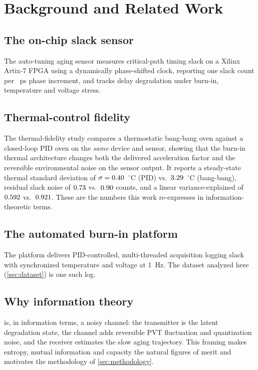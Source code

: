 \section{Background and Related Work}
\label{sec:background}


\subsection{The on-chip slack sensor}
The auto-tuning aging sensor \cite{nogueira_sensor} measures critical-path
timing slack on a Xilinx Artix-7 FPGA using a dynamically phase-shifted clock,
reporting one slack count per \valLSBps~ps phase increment, and tracks delay
degradation under burn-in, temperature and voltage stress.

\subsection{Thermal-control fidelity}
The thermal-fidelity study \cite{alencar_fidelity} compares a thermostatic
bang-bang oven against a closed-loop PID oven on the \emph{same} device and
sensor, showing that the burn-in thermal architecture changes both the delivered
acceleration factor and the reversible environmental noise on the sensor output.
It reports a steady-state thermal standard deviation of $\sigma=0.40$~$^\circ$C
(PID) vs.\ $3.29$~$^\circ$C (bang-bang), residual slack noise of
$0.73$ vs.\ $0.90$ counts, and a linear variance-explained of
$0.592$ vs.\ $0.921$. These are the numbers this work re-expresses
in information-theoretic terms.

\subsection{The automated burn-in platform}
The platform \cite{alencarfilho_tcc} delivers PID-controlled, multi-threaded
acquisition logging slack with synchronized temperature and voltage at 1~Hz. The
dataset analyzed here (\cref{sec:dataset}) is one such log.

\subsection{Why information theory}
 is, in information terms, a noisy channel: the transmitter is the
latent degradation state, the channel adds reversible PVT fluctuation and
quantization noise, and the receiver estimates the slow aging trajectory. This
framing makes entropy, mutual information and capacity the natural figures of
merit and motivates the methodology of \cref{sec:methodology}.

